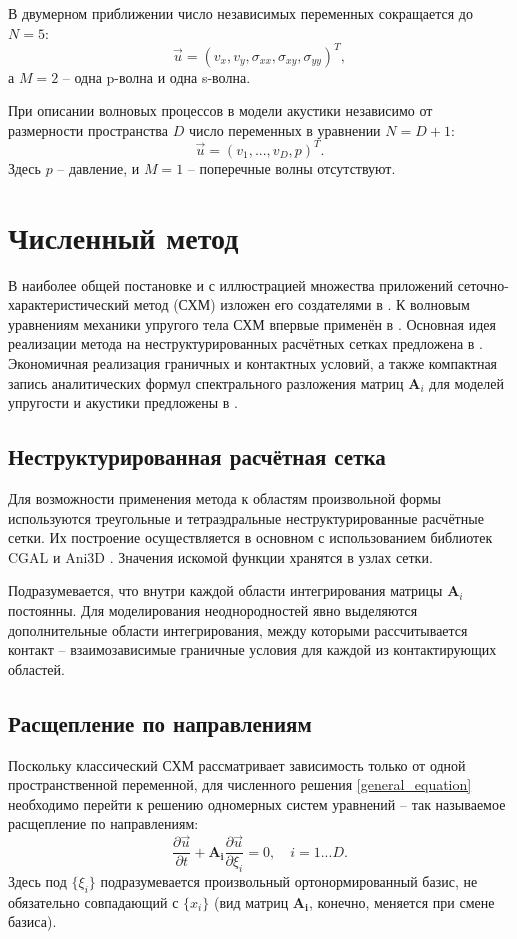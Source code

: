 В двумерном приближении число независимых переменных сокращается до $N = 5$:
\begin{equation}
	\vec{u} = (v_x,v_y,\sigma_{xx},\sigma_{xy},\sigma_{yy})^{T},
\end{equation}
а $M = 2$ -- одна p-волна и одна s-волна.

При описании волновых процессов в модели акустики независимо от размерности 
пространства $D$ число переменных в уравнении $N = D + 1$:
\begin{equation}
	\vec{u} = (v_1, ..., v_D, p)^T.
\end{equation}
Здесь $p$ -- давление, и $M = 1$ -- поперечные волны отсутствуют.


\section{Численный метод}
В наиболее общей постановке и с иллюстрацией множества приложений 
сеточно-характеристический метод (СХМ) 
изложен его создателями в \cite{magomedov_kholodov_1988}. 
К волновым уравнениям механики упругого тела 
СХМ впервые применён в \cite{petrov_kholodov}.
Основная идея реализации метода на неструктурированных расчётных сетках
предложена в \cite{magomedov_kholodov_1988}. 
Экономичная реализация граничных и контактных условий, а также
компактная запись аналитических формул спектрального разложения 
матриц $\mathbf{A}_i$ для моделей упругости и акустики предложены в \cite{chelnokov}.


\subsection{Неструктурированная расчётная сетка}
Для возможности применения метода к областям произвольной формы используются
треугольные и тетраэдральные неструктурированные расчётные сетки. 
Их построение осуществляется в основном с использованием 
библиотек CGAL \cite{cgal} и Ani3D \cite{ani3d}.
Значения искомой функции хранятся в узлах сетки. 

Подразумевается, что внутри каждой области интегрирования матрицы $\mathbf{A}_i$
постоянны. Для моделирования неоднородностей явно выделяются дополнительные
области интегрирования, между которыми рассчитывается контакт -- взаимозависимые
граничные условия для каждой из контактирующих областей.


\subsection{Расщепление по направлениям}
Поскольку классический СХМ рассматривает зависимость только от одной пространственной переменной,
для численного решения \eqref{general_equation} необходимо
перейти к решению одномерных систем уравнений -- так называемое расщепление по направлениям:
\begin{equation}
\label{equation_1d}
	\frac{\partial\vec{u}}{\partial{t}}+\mathbf{A_i}\frac{\partial\vec{u}}{\partial{\xi_i}} = 0, \quad i = 1 ... D.
\end{equation}
Здесь под $\{\xi_i\}$ подразумевается произвольный ортонормированный базис, 
не обязательно совпадающий с $\{x_i\}$ 
(вид матриц $\mathbf{A_i}$, конечно, меняется при смене базиса).

